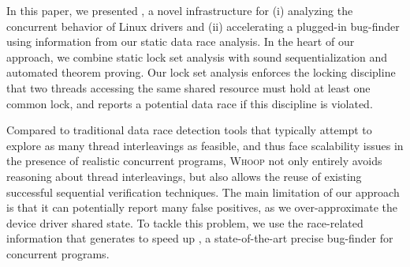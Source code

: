 In this paper, we presented \whoop, a novel infrastructure for (i) analyzing the concurrent behavior of Linux drivers and (ii) accelerating a plugged-in bug-finder using information from our static data race analysis. In the heart of our approach, we combine static lock set analysis with sound sequentialization and automated theorem proving. Our lock set analysis enforces the locking discipline that two threads accessing the same shared resource must hold at least one common lock, and reports a potential data race if this discipline is violated.

Compared to traditional data race detection tools that typically attempt to explore as many thread interleavings as feasible, and thus face scalability issues in the presence of realistic concurrent programs, \textsc{Whoop} not only entirely avoids reasoning about thread interleavings, but also allows the reuse of existing successful sequential verification techniques. The main limitation of our approach is that it can potentially report many false positives, as we over-approximate the device driver shared state. To tackle this problem, we use the race-related information that \whoop generates to speed up \corral, a state-of-the-art precise bug-finder for concurrent programs.